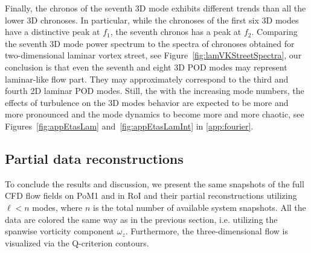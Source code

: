 {{{%

{Finally, the chronos of the seventh 3D mode exhibits different trends than all the lower 3D chronoses. In particular, while the chronoses of the first six 3D modes have a distinctive peak at $f_{1}$, the seventh chronos has a peak at $f_{2}$. {Comparing the seventh 3D mode power spectrum to the spectra of chronoses obtained for two-dimensional laminar vortex street, see Figure~\ref{fig:lamVKStreetSpectra}, our conclusion is that even the seventh and eight 3D POD modes may represent laminar-like flow part. They may approximately correspond to the third and fourth 2D laminar POD modes. Still, the with the increasing mode numbers, the effects of turbulence on the 3D modes behavior are expected to be more and more pronounced and the mode dynamics to become more and more chaotic, see Figures~\ref{fig:appEtasLam} and~\ref{fig:appEtasLamInt} in \ref{app:fourier}.}


\subsection{Partial data reconstructions}
\label{sub:partRec}
To conclude the results and discussion, we present the same snapshots of the full CFD flow fields on PoM1 and in RoI and their partial reconstructions utilizing $\ell < n$ modes, where $n$ is the total number of available system snapshots. All the data are colored the same way as in the previous section, i.e. utilizing the spanwise vorticity component $\omega_{z}$. Furthermore, the three-dimensional flow is visualized via the Q-criterion contours.

}}}}
